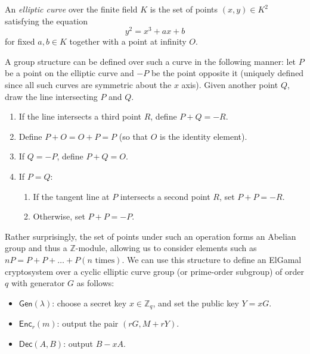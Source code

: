 \documentclass[12pt,a4paper]{article}
\theoremstyle{definition}
\begin{document}
\begin{definition}
    An \textit{elliptic curve} over the finite field $K$ is the set of points $(x, y)\in K^2$ satisfying the equation
    $$y^2 = x^3 + ax + b$$
    for fixed $a, b\in K$ together with a point at infinity $O$.
\end{definition}

A group structure can be defined over such a curve in the following manner: let $P$ be a point on the elliptic curve and $-P$ be the point opposite it (uniquely defined since all such curves are symmetric about the $x$ axis). Given another point $Q$, draw the line intersecting $P$ and $Q$.
\begin{enumerate}
    \item If the line intersects a third point $R$, define $P + Q = -R$.
    \item Define $P + O = O + P = P$ (so that $O$ is the identity element).
    \item If $Q = -P$, define $P + Q = O$.
    \item If $P = Q$:
    \begin{enumerate}
        \item If the tangent line at $P$ intersects a second point $R$, set $P + P = -R$.
        \item Otherwise, set $P + P = -P$.
    \end{enumerate}
\end{enumerate}
Rather surprisingly, the set of points under such an operation forms an Abelian group and thus a $\mathbb{Z}$-module, allowing us to consider elements such as $nP = P + P + \ldots + P (n \text{ times})$. We can use this structure to define an ElGamal cryptosystem over a cyclic elliptic curve group (or prime-order subgroup) of order $q$ with generator $G$ as follows:
\begin{itemize}
    \item $\mathsf{Gen}(\lambda)$: choose a secret key $x\in\mathbb{Z}_q$, and set the public key $Y = xG$.
    \item $\mathsf{Enc}_r(m)$: output the pair $(rG, M + rY)$.
    \item $\mathsf{Dec}(A, B)$: output $B - xA$.
\end{itemize}
\end{document}

